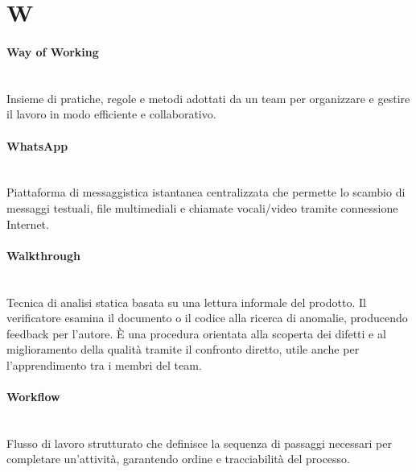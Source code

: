 \documentclass[a4paper, 10pt, colorlinks=true, linkcolor=black, urlcolor=blue, citecolor=blue, hidelinks]{article}
\newcommand{\glossaryterm}[2]{
    \paragraph{#1 \label{term:#1}} \mbox{} \\
    #2
    \vspace{0.5em}
}
\begin{document}
\newpage

\section*{W}

\glossaryterm{Way of Working}{Insieme di pratiche, regole e metodi adottati da un team per organizzare e gestire il lavoro in modo efficiente e collaborativo.}

\glossaryterm{WhatsApp}{Piattaforma di messaggistica istantanea centralizzata che permette lo scambio di messaggi testuali, file multimediali e chiamate vocali/video tramite connessione Internet.}

\glossaryterm{Walkthrough}{Tecnica di analisi statica basata su una lettura informale del prodotto. Il verificatore esamina il documento o il codice alla ricerca di anomalie, producendo feedback per l'autore. È una procedura orientata alla scoperta dei difetti e al miglioramento della qualità tramite il confronto diretto, utile anche per l'apprendimento tra i membri del team.}

\glossaryterm{Workflow}{Flusso di lavoro strutturato che definisce la sequenza di passaggi necessari per completare un'attività, garantendo ordine e tracciabilità del processo.}
\end{document}
